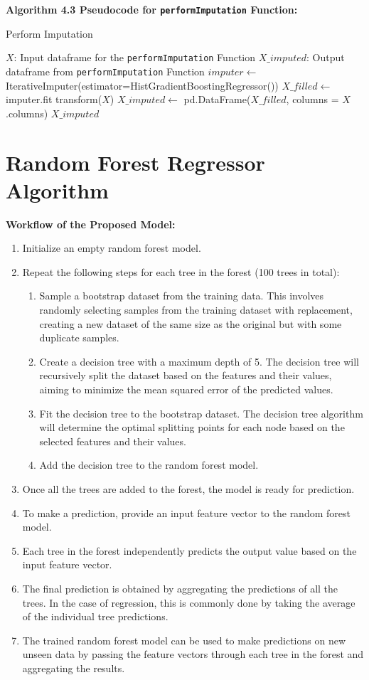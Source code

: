 \textbf{Algorithm 4.3 Pseudocode for \texttt{performImputation} Function:}
\begin{algorithm}
\caption{Perform Imputation}
\begin{algorithmic}[1]
\Require $X$: Input dataframe for the \texttt{performImputation} Function
\Ensure $X\_imputed$: Output dataframe from \texttt{performImputation} Function
    \State $imputer \gets$ IterativeImputer(estimator=HistGradientBoostingRegressor())
    \State $X\_filled \gets$ imputer.fit transform($X$)
    \State $X\_imputed \gets$ pd.DataFrame($X\_filled$, columns = $X$.columns)
    \State \Return $X\_imputed$
\EndFunction
\end{algorithmic}
\end{algorithm}

\section{Random Forest Regressor Algorithm}

\textbf{Workflow of the Proposed Model:}
\begin{enumerate}
    \item Initialize an empty random forest model.
    \item Repeat the following steps for each tree in the forest (100 trees in total):
    \begin{enumerate}
        \item Sample a bootstrap dataset from the training data. This involves randomly selecting samples from the training dataset with replacement, creating a new dataset of the same size as the original but with some duplicate samples.
        \item Create a decision tree with a maximum depth of 5. The decision tree will recursively split the dataset based on the features and their values, aiming to minimize the mean squared error of the predicted values.
        \item Fit the decision tree to the bootstrap dataset. The decision tree algorithm will determine the optimal splitting points for each node based on the selected features and their values.
        \item Add the decision tree to the random forest model.
    \end{enumerate}
    \item Once all the trees are added to the forest, the model is ready for prediction.
    \item To make a prediction, provide an input feature vector to the random forest model.
    \item Each tree in the forest independently predicts the output value based on the input feature vector.
    \item The final prediction is obtained by aggregating the predictions of all the trees. In the case of regression, this is commonly done by taking the average of the individual tree predictions.
    \item The trained random forest model can be used to make predictions on new unseen data by passing the feature vectors through each tree in the forest and aggregating the results.
\end{enumerate}

